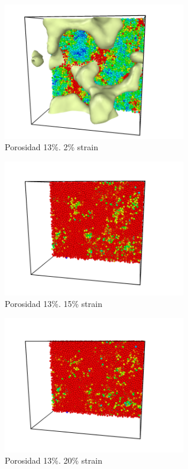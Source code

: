\documentclass[10pt, oneside]{article} %
\begin{document}
\begin{figure}[H]
\centering
\includegraphics[width=8cm]{Figures/Porosidad/18_2strain_color.png}
\caption{Porosidad 13\%. 2\% strain}
\end{figure}

\begin{figure}[H]
\centering
\includegraphics[width=8cm]{Figures/Porosidad/18_15strain_color.png}
\caption{Porosidad 13\%. 15\% strain}
\end{figure}

\begin{figure}[H]
\centering
\includegraphics[width=8cm]{Figures/Porosidad/18_20strain_color.png}
\caption{Porosidad 13\%. 20\% strain}
\end{figure}
\end{document}
